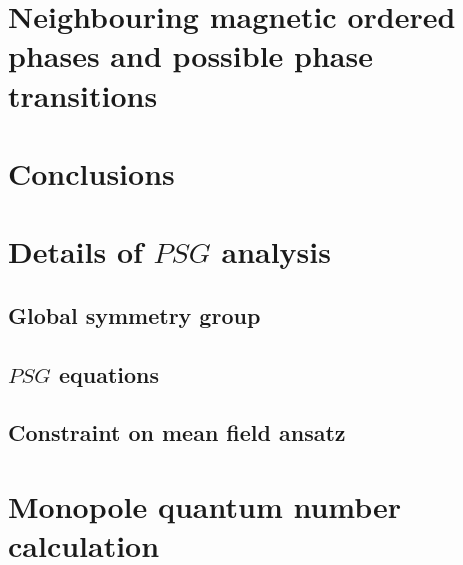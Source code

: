 \documentclass[%
 reprint,
 amsmath,amssymb,
 aps,
 pra, %
]{revtex4-1}
\begin{document}
\section{Neighbouring magnetic ordered phases and possible phase transitions}

\section{Conclusions}


\appendix

\section{Details of $PSG$ analysis}
\subsection{Global symmetry group}
\subsection{$PSG$ equations}
\subsection{Constraint on mean field ansatz}

\section{Monopole quantum number calculation}



\end{document}
